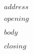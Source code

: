 \documentclass[$campus$,$dept$,$if(fontsize)$$fontsize$,$endif$]{ucletter}
\begin{document}
\begin{letter}{
   $address$
 }


 \opening{$opening$}

$body$
 
\closing{$closing$ \\
\vspace{1cm}
}
\end{letter}
\end{document}

